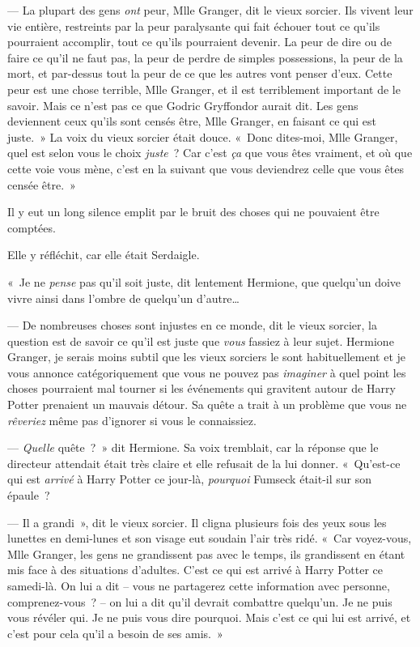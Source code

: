 --- La plupart des gens \emph{ont} peur, Mlle Granger, dit le vieux sorcier. Ils vivent leur vie entière, restreints par la peur paralysante qui fait échouer tout ce qu'ils pourraient accomplir, tout ce qu'ils pourraient devenir. La peur de dire ou de faire ce qu'il ne faut pas, la peur de perdre de simples possessions, la peur de la mort, et par-dessus tout la peur de ce que les autres vont penser d'eux. Cette peur est une chose terrible, Mlle Granger, et il est terriblement important de le savoir. Mais ce n'est pas ce que Godric Gryffondor aurait dit. Les gens deviennent ceux qu'ils sont censés être, Mlle Granger, en faisant ce qui est juste.~» La voix du vieux sorcier était douce. «~Donc dites-moi, Mlle Granger, quel est selon vous le choix \emph{juste}~? Car c'est \emph{ça} que vous êtes vraiment, et où que cette voie vous mène, c'est en la suivant que vous deviendrez celle que vous êtes censée être.~»

Il y eut un long silence emplit par le bruit des choses qui ne pouvaient être comptées.

Elle y réfléchit, car elle était Serdaigle.

«~Je ne \emph{pense} pas qu'il soit juste, dit lentement Hermione, que quelqu'un doive vivre ainsi dans l'ombre de quelqu'un d'autre…

--- De nombreuses choses sont injustes en ce monde, dit le vieux sorcier, la question est de savoir ce qu'il est juste que \emph{vous} fassiez à leur sujet. Hermione Granger, je serais moins subtil que les vieux sorciers le sont habituellement et je vous annonce catégoriquement que vous ne pouvez pas \emph{imaginer} à quel point les choses pourraient mal tourner si les événements qui gravitent autour de Harry Potter prenaient un mauvais détour. Sa quête a trait à un problème que vous ne \emph{rêveriez} même pas d'ignorer si vous le connaissiez.

--- \emph{Quelle} quête~?~» dit Hermione. Sa voix tremblait, car la réponse que le directeur attendait était très claire et elle refusait de la lui donner. «~Qu'est-ce qui est \emph{arrivé} à Harry Potter ce jour-là, \emph{pourquoi} Fumseck était-il sur son épaule~?

--- Il a grandi~», dit le vieux sorcier. Il cligna plusieurs fois des yeux sous les lunettes en demi-lunes et son visage eut soudain l'air très ridé. «~Car voyez-vous, Mlle Granger, les gens ne grandissent pas avec le temps, ils grandissent en étant mis face à des situations d'adultes. C'est ce qui est arrivé à Harry Potter ce samedi-là. On lui a dit -- vous ne partagerez cette information avec personne, comprenez-vous~? -- on lui a dit qu'il devrait combattre quelqu'un. Je ne puis vous révéler qui. Je ne puis vous dire pourquoi. Mais c'est ce qui lui est arrivé, et c'est pour cela qu'il a besoin de ses amis.~»

